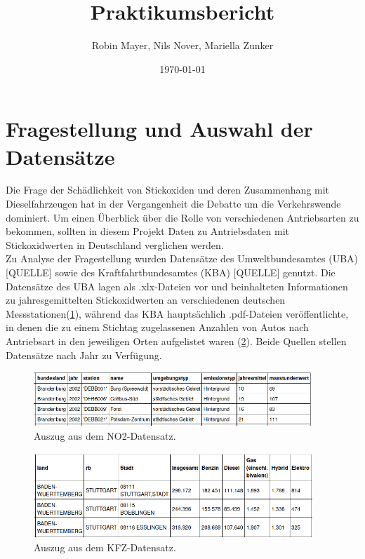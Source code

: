 \documentclass[11pt,a4paper,oneside,german]{article}
\title{Praktikumsbericht}
\author{Robin Mayer, Nils Nover, Mariella Zunker}
\date{\today}
\begin{document}
\maketitle

\newpage

\tableofcontents

\section{Fragestellung und Auswahl der Datensätze}

Die Frage der Schädlichkeit von Stickoxiden und deren Zusammenhang mit Dieselfahrzeugen hat in der Vergangenheit die Debatte um die Verkehrswende dominiert. Um einen Überblick über die Rolle von verschiedenen Antriebsarten zu bekommen, sollten in diesem Projekt Daten zu Antriebsdaten mit Stickoxidwerten in Deutschland verglichen werden. \\
Zu Analyse der Fragestellung wurden Datensätze des Umweltbundesamtes (UBA) [QUELLE] sowie des Kraftfahrtbundesamtes (KBA) [QUELLE] genutzt. Die Datensätze des UBA lagen als .xlx-Dateien vor und beinhalteten Informationen zu jahresgemittelten Stickoxidwerten an verschiedenen deutschen Messstationen(\ref{fig:BeispielNO2}), während das KBA hauptsächlich .pdf-Dateien veröffentlichte, in denen die zu einem Stichtag zugelassenen Anzahlen von Autos nach Antriebsart in den jeweiligen Orten aufgelistet waren (\ref{fig:BeispielKFZ}). Beide Quellen stellen Datensätze nach Jahr zu Verfügung.

\begin{figure}[h!]
	\centering
	\includegraphics[width=10.5cm]{BeispielNO2.png}
	\caption{Auszug aus dem NO2-Datensatz.}
	\label{fig:BeispielNO2}
\end{figure}

\begin{figure}[h!]
	\centering
	\includegraphics[width=10.5cm]{BeispielKFZ.png}
	\caption{Auszug aus dem KFZ-Datensatz.}
	\label{fig:BeispielKFZ}
\end{figure}
\end{document}
